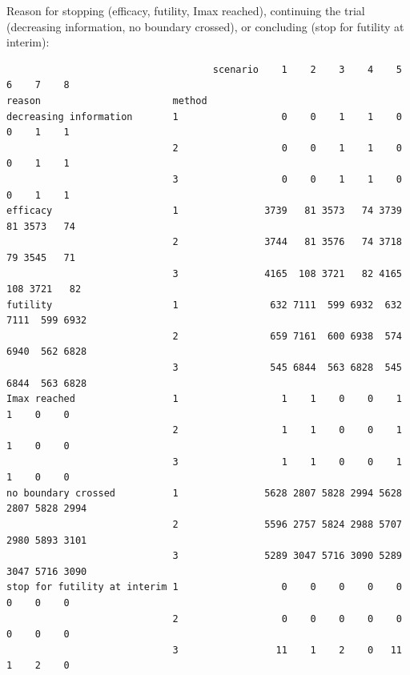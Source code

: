 \documentclass[12pt]{article}
\begin{document}
Reason for stopping (efficacy, futility, Imax reached), continuing the
trial (decreasing information, no boundary crossed), or concluding
(stop for futility at interim):
\begin{verbatim}
                                    scenario    1    2    3    4    5    6    7    8
reason                       method                                                 
decreasing information       1                  0    0    1    1    0    0    1    1
                             2                  0    0    1    1    0    0    1    1
                             3                  0    0    1    1    0    0    1    1
efficacy                     1               3739   81 3573   74 3739   81 3573   74
                             2               3744   81 3576   74 3718   79 3545   71
                             3               4165  108 3721   82 4165  108 3721   82
futility                     1                632 7111  599 6932  632 7111  599 6932
                             2                659 7161  600 6938  574 6940  562 6828
                             3                545 6844  563 6828  545 6844  563 6828
Imax reached                 1                  1    1    0    0    1    1    0    0
                             2                  1    1    0    0    1    1    0    0
                             3                  1    1    0    0    1    1    0    0
no boundary crossed          1               5628 2807 5828 2994 5628 2807 5828 2994
                             2               5596 2757 5824 2988 5707 2980 5893 3101
                             3               5289 3047 5716 3090 5289 3047 5716 3090
stop for futility at interim 1                  0    0    0    0    0    0    0    0
                             2                  0    0    0    0    0    0    0    0
                             3                 11    1    2    0   11    1    2    0
\end{verbatim}
\end{document}
